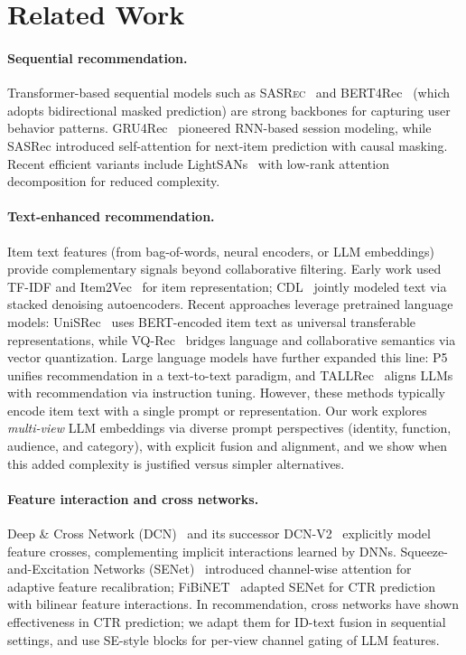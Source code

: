 \documentclass[sigconf,natbib=true,anonymous]{acmart}
\newcommand{\base}{\textsc{SASRec}\xspace}
\newcommand{\llm}{\textsc{LLM}\xspace}
\begin{document}
\section{Related Work}
\paragraph{Sequential recommendation.}
Transformer-based sequential models such as
\base~\cite{kang2018sasrec} and BERT4Rec~\cite{sun2019bert4rec}
(which adopts bidirectional masked prediction) are strong backbones for
capturing user behavior patterns.
GRU4Rec~\cite{hidasi2016gru4rec} pioneered RNN-based session
modeling, while SASRec introduced self-attention for next-item
prediction with causal masking. Recent efficient variants
include LightSANs~\cite{fan2021lightsans} with low-rank
attention decomposition for reduced complexity.

\paragraph{Text-enhanced recommendation.}
\begin{sloppypar}
Item text features (from bag-of-words, neural encoders, or
\llm embeddings) provide complementary signals beyond
collaborative filtering. Early work used TF-IDF and
Item2Vec~\cite{barkan2016item2vec} for item representation;
CDL~\cite{wang2015cdl} jointly modeled text via stacked
denoising autoencoders. Recent approaches leverage pretrained
language models: UniSRec~\cite{hou2022unisrec} uses
BERT-encoded item text as universal transferable
representations, while VQ-Rec~\cite{hou2023vqrec} bridges
language and collaborative semantics via vector quantization.
Large language models have further expanded this line:
P5~\cite{geng2022p5} unifies recommendation in a text-to-text
paradigm, and TALLRec~\cite{bao2023tallrec} aligns LLMs with
recommendation via instruction tuning.
However, these methods typically encode item text with a single
prompt or representation.
Our work explores \emph{multi-view} \llm embeddings via diverse
prompt perspectives (identity, function, audience, and category),
with explicit fusion and alignment, and we show when this added
complexity is justified versus simpler alternatives.
\end{sloppypar}

\paragraph{Feature interaction and cross networks.}
\begin{sloppypar}
Deep \& Cross Network (DCN)~\cite{wang2017dcn} and its
successor DCN-V2~\cite{wang2021dcnv2} explicitly model feature
crosses, complementing implicit interactions learned by DNNs.
Squeeze-and-Excitation Networks (SENet)~\cite{hu2018senet}
introduced channel-wise attention for adaptive feature
recalibration; FiBiNET~\cite{huang2019fibinet} adapted SENet
for CTR prediction with bilinear feature interactions. In
recommendation, cross networks have shown effectiveness in CTR
prediction; we adapt them for ID-text fusion in sequential
settings, and use SE-style blocks for per-view channel gating of \llm
features.
\end{sloppypar}
\end{document}
